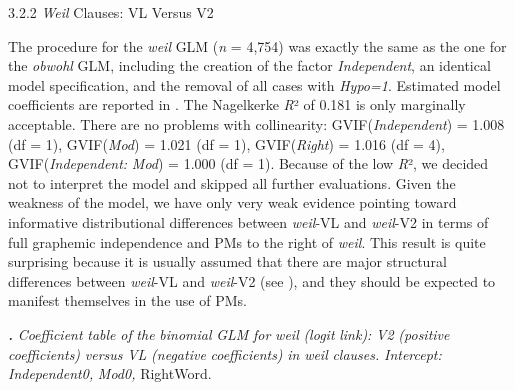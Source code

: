 \begin{styleMoutonHeadingii}
3.2.2  \textit{Weil} Clauses: VL Versus V2
\end{styleMoutonHeadingii}

\begin{styleMoutonText}
The procedure for the \textit{weil} GLM (\textit{n} = 4,754) was exactly the same as the one for the \textit{obwohl} GLM, including the creation of the factor \textit{Independent}, an identical model specification, and the removal of all cases with \textit{Hypo=1}. Estimated model coefficients are reported in . The Nagelkerke \textit{R}² of 0.181 is only marginally acceptable. There are no problems with collinearity: GVIF(\textit{Independent}) = 1.008 (df = 1), GVIF(\textit{Mod}) = 1.021 (df = 1), GVIF(\textit{Right}) = 1.016 (df = 4), GVIF(\textit{Independent:} \textit{Mod}) = 1.000 (df = 1). Because of the low \textit{R}², we decided not to interpret the model and skipped all further evaluations. Given the weakness of the model, we have only very weak evidence pointing toward informative distributional differences between \textit{weil}{}-VL and \textit{weil}{}-V2 in terms of full graphemic independence and PMs to the right of \textit{weil}. This result is quite surprising because it is usually assumed that there are major structural differences between \textit{weil}{}-VL and \textit{weil}{}-V2 (see ), and they should be expected to manifest themselves in the use of PMs.
\end{styleMoutonText}

\begin{styleMoutonCaption}
\textbf{\textit{.}} \textit{Coefficient} \textit{table} \textit{of} \textit{the} \textit{binomial} \textit{GLM} \textit{for} \textit{weil} \textit{(logit} \textit{link):} \textit{V2} \textit{(positive} \textit{coefficients)} \textit{versus} \textit{VL} \textit{(nega\-tive} \textit{coefficients)} \textit{in} \textit{weil} \textit{clauses.} \textit{Intercept:} \textit{Independent0,} \textit{Mod0,} RightWord.
\end{styleMoutonCaption}

\tablefirsthead{}


